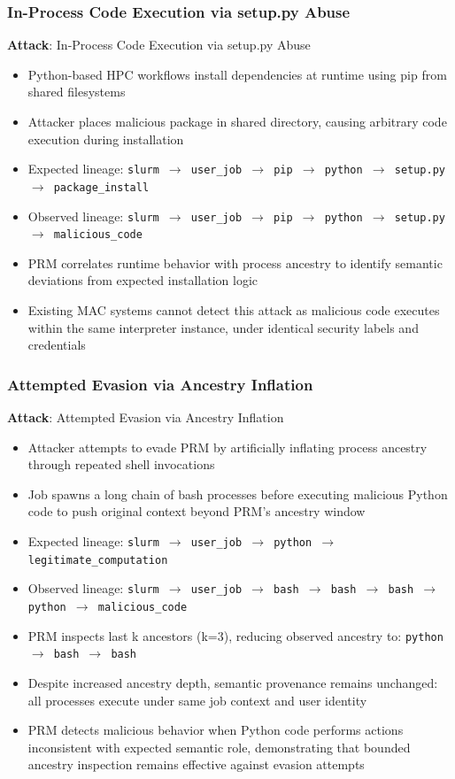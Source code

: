 \documentclass[conference]{IEEEtran}
\begin{document}
\subsubsection{In-Process Code Execution via setup.py Abuse}
\textbf{Attack}: In-Process Code Execution via setup.py Abuse
\begin{itemize}
\item Python-based HPC workflows install dependencies at runtime using pip from shared filesystems
\item Attacker places malicious package in shared directory, causing arbitrary code execution during installation
\item Expected lineage: \texttt{slurm $\rightarrow$ user\_job $\rightarrow$ pip $\rightarrow$ python $\rightarrow$ setup.py $\rightarrow$ package\_install}
\item Observed lineage: \texttt{slurm $\rightarrow$ user\_job $\rightarrow$ pip $\rightarrow$ python $\rightarrow$ setup.py $\rightarrow$ malicious\_code}
\item PRM correlates runtime behavior with process ancestry to identify semantic deviations from expected installation logic
\item Existing MAC systems cannot detect this attack as malicious code executes within the same interpreter instance, under identical security labels and credentials
\end{itemize}

\subsubsection{Attempted Evasion via Ancestry Inflation}
\textbf{Attack}: Attempted Evasion via Ancestry Inflation
\begin{itemize}
\item Attacker attempts to evade PRM by artificially inflating process ancestry through repeated shell invocations
\item Job spawns a long chain of bash processes before executing malicious Python code to push original context beyond PRM's ancestry window
\item Expected lineage: \texttt{slurm $\rightarrow$ user\_job $\rightarrow$ python $\rightarrow$ legitimate\_computation}
\item Observed lineage: \texttt{slurm $\rightarrow$ user\_job $\rightarrow$ bash $\rightarrow$ bash $\rightarrow$ bash $\rightarrow$ python $\rightarrow$ malicious\_code}
\item PRM inspects last k ancestors (k=3), reducing observed ancestry to: \texttt{python $\rightarrow$ bash $\rightarrow$ bash}
\item Despite increased ancestry depth, semantic provenance remains unchanged: all processes execute under same job context and user identity
\item PRM detects malicious behavior when Python code performs actions inconsistent with expected semantic role, demonstrating that bounded ancestry inspection remains effective against evasion attempts
\end{itemize}
\end{document}
